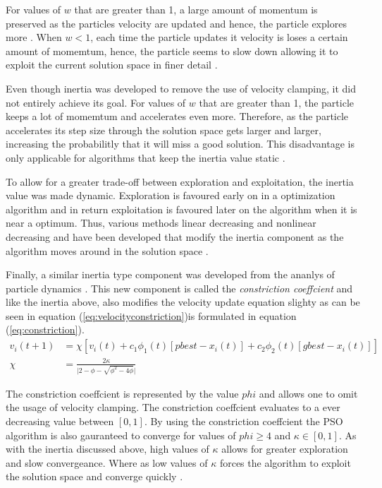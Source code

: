 For values of $w$ that are greater than 1, a large amount of momentum is preserved as the particles velocity are updated and hence, the particle explores more \cite{FundamentalSwarm}. When $w < 1$, each time the particle updates it velocity is loses a certain amount of momemtum, hence, the particle seems to slow down allowing it to exploit the current solution space in finer detail \cite{FundamentalSwarm}.

Even though inertia was developed to remove the use of velocity clamping, it did not entirely achieve its goal. For values of $w$ that are greater than 1, the particle keeps a lot of momemtum and accelerates even more. Therefore, as the particle accelerates its step size through the solution space gets larger and larger, increasing the probabilitly that it will miss a good solution. This disadvantage is only applicable for algorithms that keep the inertia value static \cite{CompuIntelligenceIntro,FundamentalSwarm}.

To allow for a greater trade-off between exploration and exploitation, the inertia value was made dynamic. Exploration is favoured early on in a optimization algorithm and in return exploitation is favoured later on the algorithm when it is near a optimum. Thus, various methods linear decreasing and nonlinear decreasing and have been developed that modify the inertia component as the algorithm moves around in the solution space \cite{CompuIntelligenceIntro,FundamentalSwarm}.

Finally, a similar inertia type component was developed from the ananlys of particle dynamics \cite{FundamentalSwarm}. This new component is called the \emph{constriction coeffcient} and like the inertia above, also modifies the velocity update equation slighty as can be seen in equation (\ref{eq:velocityconstriction})is formulated in equation (\ref{eq:constriction})\cite{adaptPSO,FundamentalSwarm,CompuIntelligenceIntro}.
\begin{align}
v_i(t+1) &= \chi[v_i(t) + c_1\phi_{1}(t)[pbest - x_i(t)] + c_2\phi_{2}(t)[gbest - x_i(t)]]\label{eq:velocityconstriction}\\
\chi &= \frac{2\kappa}{\lvert 2 - \phi - \sqrt{\phi^2 - 4\phi}\rvert}\label{eq:constriction}
\end{align}

The constriction coeffcient is represented by the value $phi$ and allows one to omit the usage of velocity clamping. The constriction coeffcient evaluates to a ever decreasing value between $[0,1]$. By using the constriction coeffcient the PSO algorithm is also gauranteed to converge for values of $phi \geq 4$ and $\kappa \in [0,1]$. As with the inertia discussed above, high values of $\kappa$ allows for greater exploration and slow convergeance. Where as low values of $\kappa$ forces the algorithm to exploit the solution space and converge quickly \cite{adaptPSO,FundamentalSwarm,CompuIntelligenceIntro}.
